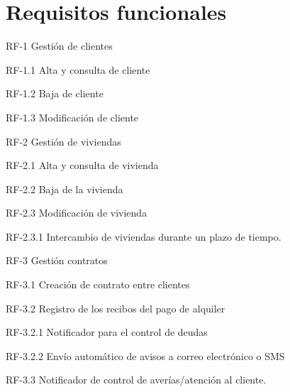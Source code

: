 \section{Requisitos funcionales}

RF-1 Gestión de clientes

	RF-1.1 Alta y consulta de cliente
	
	RF-1.2 Baja de cliente

	RF-1.3 Modificación de cliente	


RF-2 Gestión de viviendas
	
	RF-2.1 Alta y consulta de vivienda

	RF-2.2 Baja de la vivienda

	RF-2.3 Modificación de vivienda
		
		RF-2.3.1 Intercambio de viviendas durante un plazo de tiempo.

RF-3 Gestión contratos

	RF-3.1  Creación de contrato entre clientes

	RF-3.2	Registro de los recibos del pago de alquiler

		RF-3.2.1    Notificador para el control de deudas

		RF-3.2.2    Envío automático de avisos a correo electrónico o SMS

	RF-3.3  Notificador de control de averías/atención al cliente.



